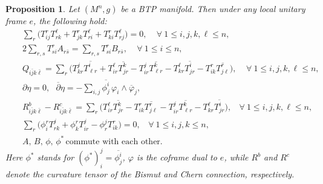 \documentclass[10pt,a4paper]{amsart}
\newtheorem{proposition}{Proposition}
\begin{document}
\begin{proposition} \label{prop1.5}
Let $(M^n,g)$ be a BTP manifold. Then under any local unitary frame $e$, the following hold:
\begin{eqnarray}
&&  \sum_r \big( T^r_{ij}T^{\ell}_{r k} + T^r_{jk}T^{\ell}_{ri} + T^r_{ki}T^{\ell}_{rj}\big) =0,  \ \ \ \ \ \forall \ 1\leq i,j,k,\ell \leq n, \label{eq:1.5} \\
&& 2 \sum_{r,s} T^r_{si} A_{r\bar{s}} =  \sum_{r,s} T^r_{si} B_{r\bar{s}} , \ \ \ \ \ \forall \ 1\leq i\leq n, \label{eq:1.6} \\
&& Q_{i\bar{j}k\bar{\ell}}  = \sum_r \big( T^j_{kr} \overline{ T^i_{\ell r} } + T^{\ell}_{ir} \overline{ T^k_{j r} } - T^j_{ir} \overline{ T^k_{\ell r} } - T^{\ell}_{kr} \overline{ T^i_{j r} } - T^r_{ik} \overline{ T^r_{j\ell } } \big) ,\ \ \ \ \ \forall \ 1\leq i,j,k,\ell \leq n, \label{eq:1.7} \\
&& \partial \eta =0, \ \ \ \overline{\partial } \eta = - \sum_{i,j} \overline{\phi^i_j }\,\varphi_i \wedge \overline{\varphi}_j, \label{eq:1.8}\\
&& R^b_{i\bar{j}k\bar{\ell}} - R^c_{i\bar{j}k\bar{\ell}} = \sum_r \big( T^{\ell}_{ir} \overline{T^{k}_{jr}} -T^{r}_{ik} \overline{T^{r}_{j\ell }} - T^{j}_{ir} \overline{T^{k}_{\ell r}} - T^{\ell}_{kr} \overline{T^{i}_{jr}}\big) , \ \ \ \ \forall \ 1\leq i,j,k,\ell \leq n, \label{eq:1.9}\\
&& \sum_r \big( \phi^r_i T^j_{rk} + \phi^r_k T^j_{ir} - \phi^j_r T^r_{ik} \big) = 0, \ \  \ \ \forall \ 1\leq i,j,k\leq n, \label{eq:1.10}\\
&& A, \,B, \,\phi, \,\phi^{\ast} \, \mbox{commute with each other}. \label{eq:1.11}
\end{eqnarray}
Here $\phi^{\ast}$ stands for $ (\phi^{\ast})^j_i = \overline{\phi^i_j}$, $\varphi$ is the coframe dual to $e$, while $R^b$ and $R^c$ denote the curvature tensor of the Bismut and Chern connection, respectively.
\end{proposition}
\end{document}
